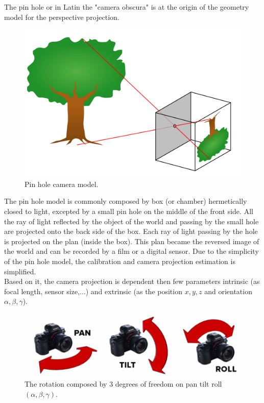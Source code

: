 The pin hole or in Latin the "camera obscura" is at the origin of the geometry model for the perspective projection.\\
\begin{figure}[t!]
\begin{center}
   \includegraphics[width=\linewidth]{img/PinholeCam.png}
  \caption{ Pin hole camera model.}\label{fig:PanTiltRoll}
  \endminipage\hfill
\end{center}
\end{figure} 
 The pin hole model is commonly composed by box (or chamber) hermetically closed to light, excepted by a small pin hole on the middle of the front side. All the ray of light reflected by the object of the world and passing by the small hole are projected onto the back side of the box. Each ray of light passing by the hole is  projected on the plan (inside the box). This plan became the reversed image of the world and can be recorded by a film or a digital sensor. 
 Due to the simplicity of the pin hole model, the calibration and camera projection estimation is simplified.\\
  Based on it, the camera projection is dependent then few parameters intrinsic (as focal length, sensor size,...) and extrinsic (as the position $x,y,z$ and orientation $\alpha,\beta,\gamma$). 
  
 
\begin{figure}[t!]
\begin{center}
   \includegraphics[width=\linewidth]{img/PanTiltRoll.png}
  \caption{The rotation composed by 3 degrees of freedom on pan tilt roll$(\alpha,\beta,\gamma)$.}\label{fig:PanTiltRoll}
  \endminipage\hfill
  \end{center}
\end{figure}

